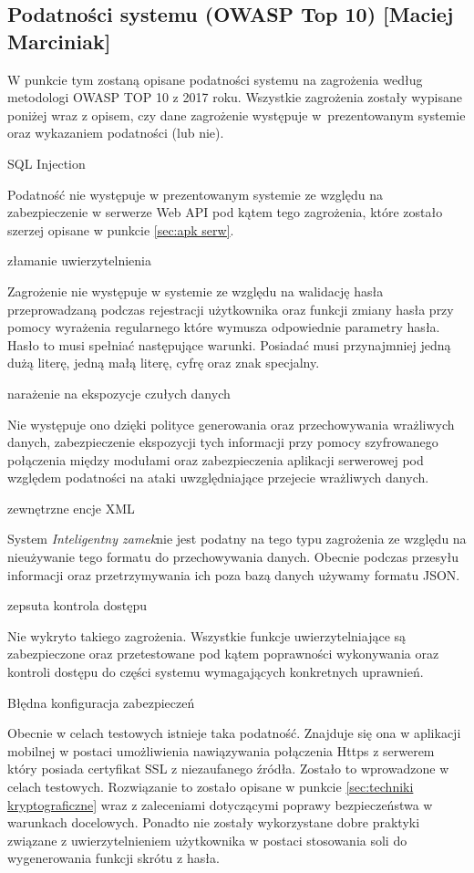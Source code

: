 \documentclass[twoside,10pt]{article}
\def\NazwaSys {\textit{Inteligentny zamek}}
\def\StudentA     {Maciej Marciniak}
\begin{document}
\subsection{Podatności systemu (OWASP Top 10) [\StudentA]} \label{sec:OWASP}
W punkcie tym zostaną opisane podatności systemu na zagrożenia według metodologi OWASP TOP 10 z 2017 roku. Wszystkie zagrożenia zostały wypisane poniżej wraz z opisem, czy dane zagrożenie występuje w~prezentowanym systemie oraz wykazaniem podatności (lub nie).
\begin{enumerate*}
\item SQL Injection 

Podatność nie występuje w prezentowanym systemie ze względu na zabezpieczenie w serwerze Web API pod kątem tego zagrożenia, które zostało szerzej opisane w punkcie \ref{sec:apk serw}.
\item złamanie uwierzytelnienia 

Zagrożenie nie występuje w systemie ze względu na walidację hasła przeprowadzaną podczas rejestracji użytkownika oraz funkcji zmiany hasła przy pomocy wyrażenia regularnego które wymusza odpowiednie parametry hasła. Hasło to musi spełniać następujące warunki. Posiadać musi przynajmniej jedną dużą literę, jedną małą literę,  cyfrę oraz znak specjalny.
\item narażenie na ekspozycje czułych danych 

Nie występuje ono dzięki polityce generowania oraz przechowywania wrażliwych danych,  zabezpieczenie ekspozycji tych informacji przy pomocy szyfrowanego połączenia między modułami oraz zabezpieczenia aplikacji serwerowej pod względem podatności na ataki uwzględniające przejecie wrażliwych danych.
\item zewnętrzne encje XML 

System \NazwaSys \space nie jest podatny na tego typu zagrożenia ze względu na nieużywanie tego formatu do przechowywania danych. Obecnie podczas przesyłu informacji oraz przetrzymywania ich poza bazą danych używamy formatu JSON.
\item zepsuta kontrola dostępu 

Nie wykryto takiego zagrożenia. Wszystkie funkcje uwierzytelniające są zabezpieczone oraz przetestowane pod kątem poprawności wykonywania oraz kontroli dostępu do części systemu wymagających konkretnych uprawnień.
\item Błędna konfiguracja zabezpieczeń

Obecnie w celach testowych istnieje taka podatność. Znajduje się ona w aplikacji mobilnej w  postaci umożliwienia nawiązywania połączenia Https z serwerem który posiada certyfikat SSL z niezaufanego źródła. Zostało to wprowadzone w celach testowych. Rozwiązanie to zostało opisane w punkcie \ref{sec:techniki kryptograficzne} wraz z zaleceniami dotyczącymi poprawy bezpieczeństwa w warunkach docelowych. Ponadto nie zostały wykorzystane dobre praktyki związane z uwierzytelnieniem użytkownika w postaci stosowania soli do wygenerowania funkcji skrótu z hasła.


\end{enumerate*}
\end{document}
